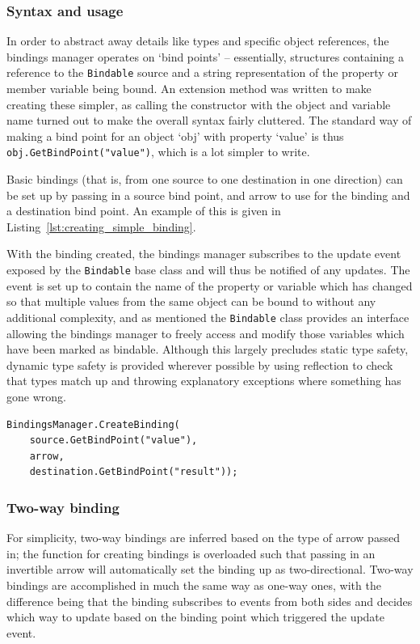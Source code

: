 \documentclass[12pt,twoside,notitlepage]{report}
\begin{document}
\subsubsection{Syntax and usage}

In order to abstract away details like types and specific object references, the bindings manager operates on `bind points' -- essentially, structures containing a reference to the \texttt{Bindable} source and a string representation of the property or member variable being bound. An extension method was written to make creating these simpler, as calling the constructor with the object and variable name turned out to make the overall syntax fairly cluttered. The standard way of making a bind point for an object `obj' with property `value' is thus \texttt{obj.GetBindPoint("value")}, which is a lot simpler to write.

Basic bindings (that is, from one source to one destination in one direction) can be set up by passing in a source bind point, and arrow to use for the binding and a destination bind point. An example of this is given in Listing~\ref{lst:creating_simple_binding}.

With the binding created, the bindings manager subscribes to the update event exposed by the \texttt{Bindable} base class and will thus be notified of any updates. The event is set up to contain the name of the property or variable which has changed so that multiple values from the same object can be bound to without any additional complexity, and as mentioned the \texttt{Bindable} class provides an interface allowing the bindings manager to freely access and modify those variables which have been marked as bindable. Although this largely precludes static type safety, dynamic type safety is provided wherever possible by using reflection to check that types match up and throwing explanatory exceptions where something has gone wrong.

\begin{lstlisting}[language={[Sharp]C}, caption={Creating a binding between two properties}, label=lst:creating_simple_binding]
BindingsManager.CreateBinding(
	source.GetBindPoint("value"),
	arrow,
	destination.GetBindPoint("result"));
\end{lstlisting}

\subsubsection{Two-way binding}

For simplicity, two-way bindings are inferred based on the type of arrow passed in; the function for creating bindings is overloaded such that passing in an invertible arrow will automatically set the binding up as two-directional. Two-way bindings are accomplished in much the same way as one-way ones, with the difference being that the binding subscribes to events from both sides and decides which way to update based on the binding point which triggered the update event.
\end{document}
